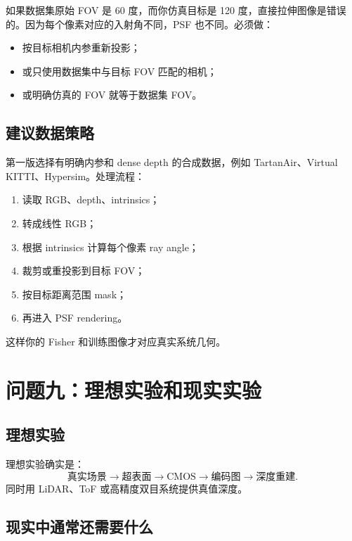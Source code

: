 \documentclass[11pt,a4paper,fontset=none]{ctexart}
\begin{document}
如果数据集原始 FOV 是 60 度，而你仿真目标是 120 度，直接拉伸图像是错误的。因为每个像素对应的入射角不同，PSF 也不同。必须做：
\begin{itemize}
  \item 按目标相机内参重新投影；
  \item 或只使用数据集中与目标 FOV 匹配的相机；
  \item 或明确仿真的 FOV 就等于数据集 FOV。
\end{itemize}

\subsection{建议数据策略}

第一版选择有明确内参和 dense depth 的合成数据，例如 TartanAir、Virtual KITTI、Hypersim。处理流程：
\begin{enumerate}
  \item 读取 RGB、depth、intrinsics；
  \item 转成线性 RGB；
  \item 根据 intrinsics 计算每个像素 ray angle；
  \item 裁剪或重投影到目标 FOV；
  \item 按目标距离范围 mask；
  \item 再进入 PSF rendering。
\end{enumerate}

这样你的 Fisher 和训练图像才对应真实系统几何。

\section{问题九：理想实验和现实实验}

\subsection{理想实验}

理想实验确实是：
\begin{equation}
  \text{真实场景}
  \rightarrow
  \text{超表面}
  \rightarrow
  \text{CMOS}
  \rightarrow
  \text{编码图}
  \rightarrow
  \text{深度重建}.
\end{equation}
同时用 LiDAR、ToF 或高精度双目系统提供真值深度。

\subsection{现实中通常还需要什么}
\end{document}

